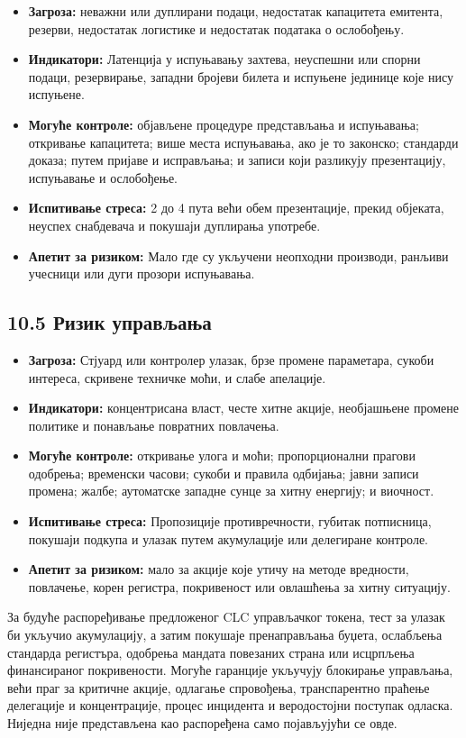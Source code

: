 \documentclass[11pt]{article}
\begin{document}
\begin{itemize}[leftmargin=*]
\item \textbf{Загроза:} неважни или дуплирани подаци, недостатак капацитета емитента, резерви, недостатак логистике и недостатак података о ослобођењу.
\item \textbf{Индикатори:} Латенција у испуњавању захтева, неуспешни или спорни подаци, резервирање, западни бројеви билета и испуњене јединице које нису испуњене.
\item \textbf{Могуће контроле:} објављене процедуре представљања и испуњавања; откривање капацитета; више места испуњавања, ако је то законско; стандарди доказа; путем пријаве и исправљања; и записи који разликују презентацију, испуњавање и ослобођење.
\item \textbf{Испитивање стреса:} 2 до 4 пута већи обем презентације, прекид објеката, неуспех снабдевача и покушаји дуплирања употребе.
\item \textbf{Апетит за ризиком:} Мало где су укључени неопходни производи, ранљиви учесници или дуги прозори испуњавања.
\end{itemize}
\subsection*{10.5 Ризик управљања}

\begin{itemize}[leftmargin=*]
\item \textbf{Загроза:} Стјуард или контролер улазак, брзе промене параметара, сукоби интереса, скривене техничке моћи, и слабе апелације.
\item \textbf{Индикатори:} концентрисана власт, честе хитне акције, необјашњене промене политике и понављање повратних повлачења.
\item \textbf{Могуће контроле:} откривање улога и моћи; пропорционални прагови одобрења; временски часови; сукоби и правила одбијања; јавни записи промена; жалбе; аутоматске западне сунце за хитну енергију; и виочност.
\item \textbf{Испитивање стреса:} Пропозиције противречности, губитак потписница, покушаји подкупа и улазак путем акумулације или делегиране контроле.
\item \textbf{Апетит за ризиком:} мало за акције које утичу на методе вредности, повлачење, корен регистра, покривеност или овлашћења за хитну ситуацију.
\end{itemize}
За будуће распоређивање предложеног CLC управљачког токена, тест за улазак би укључио акумулацију, а затим покушаје пренаправљања буџета, ослабљења стандарда регистъра, одобрења мандата повезаних страна или исцрпљења финансираног покривености. Могуће гаранције укључују блокирање управљања, већи праг за критичне акције, одлагање спровођења, транспарентно праћење делегације и концентрације, процес инцидента и веродостојни поступак одласка. Ниједна није представљена као распоређена само појављујући се овде.
\end{document}
